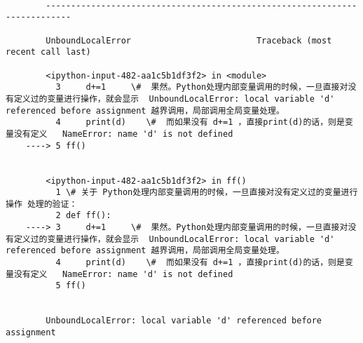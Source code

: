 \documentclass[11pt]{article}
\begin{document}
    \begin{Verbatim}[commandchars=\\\{\}]

        ---------------------------------------------------------------------------

        UnboundLocalError                         Traceback (most recent call last)

        <ipython-input-482-aa1c5b1df3f2> in <module>
          3     d+=1     \#  果然。Python处理内部变量调用的时候，一旦直接对没有定义过的变量进行操作，就会显示  UnboundLocalError: local variable 'd' referenced before assignment 越界调用，局部调用全局变量处理。
          4     print(d)    \#  而如果没有 d+=1 ，直接print(d)的话，则是变量没有定义   NameError: name 'd' is not defined
    ----> 5 ff()
    

        <ipython-input-482-aa1c5b1df3f2> in ff()
          1 \# 关于 Python处理内部变量调用的时候，一旦直接对没有定义过的变量进行操作 处理的验证：
          2 def ff():
    ----> 3     d+=1     \#  果然。Python处理内部变量调用的时候，一旦直接对没有定义过的变量进行操作，就会显示  UnboundLocalError: local variable 'd' referenced before assignment 越界调用，局部调用全局变量处理。
          4     print(d)    \#  而如果没有 d+=1 ，直接print(d)的话，则是变量没有定义   NameError: name 'd' is not defined
          5 ff()
    

        UnboundLocalError: local variable 'd' referenced before assignment

    \end{Verbatim}
\end{document}
